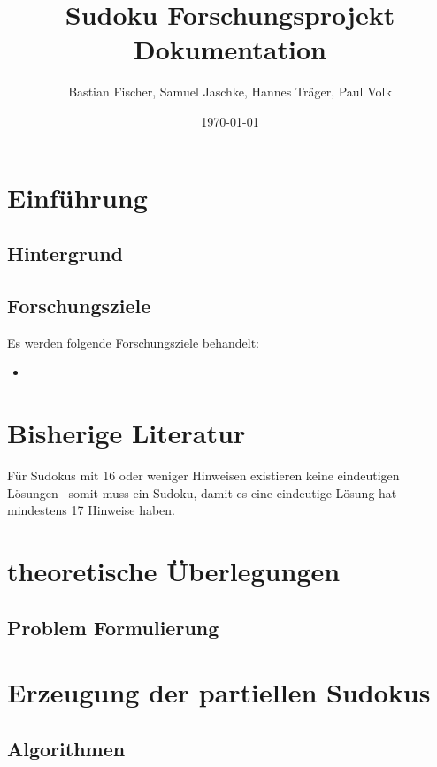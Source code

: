\documentclass[12pt,a4paper]{article}
\title{Sudoku Forschungsprojekt Dokumentation}
\author{Bastian Fischer, Samuel Jaschke, Hannes Träger, Paul Volk}
\date{\today}
\begin{document}
\maketitle

\begin{abstract}
\end{abstract}

\section{Einführung}
\subsection{Hintergrund}

\subsection{Forschungsziele}
Es werden folgende Forschungsziele behandelt:
\begin{itemize}
    \item  
\end{itemize}

\section{Bisherige Literatur}
Für Sudokus mit 16 oder weniger Hinweisen existieren keine eindeutigen Lösungen~\cite{DBLP:journals/corr/abs-1201-0749} somit muss ein Sudoku, damit es eine eindeutige Lösung hat mindestens 17 Hinweise haben.

\section{theoretische Überlegungen}

\subsection{Problem Formulierung}





\section{Erzeugung der partiellen Sudokus}




\subsection{Algorithmen}
\end{document}
